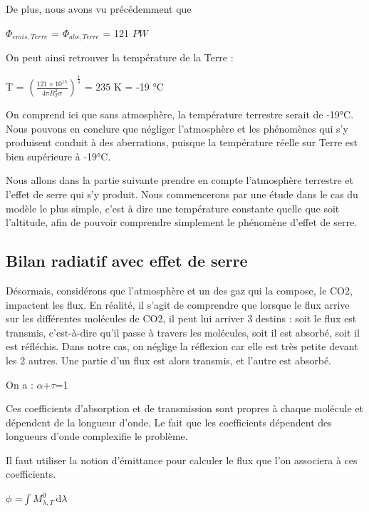 \documentclass[a4paper, 12pt]{report} %
\begin{document}
De plus, nous avons vu précédemment que
\begin{center}
$\Phi_{emis,Terre}$ = $\Phi_{abs,Terre}$  = 121 $PW$
\end{center} \vspace{\baselineskip}

On peut ainsi retrouver la température de la Terre :
\begin{center}
T = $(\frac{121 \times 10^{15}}{4 \pi R_T^{2} \sigma})^{\frac{1}{4}}$ = $235$ K = -19 °C
\end{center} \vspace{\baselineskip}

On comprend ici que sans atmosphère, la température terrestre
serait de -19°C. Nous pouvons en conclure que négliger l'atmosphère et les phénomènes qui s'y produisent
conduit à des aberrations, puisque la température réelle
sur Terre est bien supérieure à -19°C.

Nous allons dans la partie suivante prendre en compte l'atmosphère terrestre et l'effet de serre qui s'y produit. Nous commencerons par une étude dans le cas du modèle le plus simple, c'est à dire une température constante quelle que soit l'altitude, afin de pouvoir comprendre simplement le phénomène d'effet de serre.


\subsection{Bilan radiatif avec effet de serre}

Désormais, considérons que l’atmosphère et un des gaz qui la compose, le CO2, impactent les flux. En réalité, il s’agit de comprendre que lorsque le flux arrive sur les différentes molécules de CO2, il peut lui arriver 3 destins : soit le flux est transmis, c’est-à-dire qu’il passe à travers les molécules, soit il est absorbé, soit il est réfléchis. Dans notre cas, on néglige la réflexion car elle est très petite devant les 2 autres. Une partie d'un flux est alors transmis, et l’autre est absorbé.

On a :  $\alpha$+$\tau$=1

Ces coefficients d'absorption et de transmission sont propres à chaque molécule et dépendent de la longueur d’onde. Le fait que les coefficients dépendent des longueurs d’onde complexifie le problème. 

Il faut utiliser la notion d'émittance pour calculer le flux que l'on associera à ces coefficients.  

\begin{center}
$\phi$ =$\int M^0_{\lambda,T} \, \mathrm{d}\lambda$
\end{center}
\end{document}
